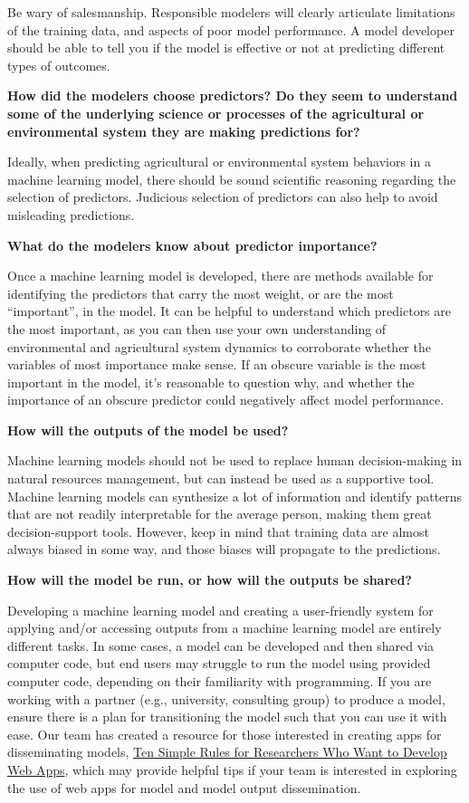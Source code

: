 \documentclass[
]{book}
\begin{document}
Be wary of salesmanship. Responsible modelers will clearly articulate limitations of the training data, and aspects of poor model performance. A model developer should be able to tell you if the model is effective or not at predicting different types of outcomes.

\textbf{How did the modelers choose predictors? Do they seem to understand some of the underlying science or processes of the agricultural or environmental system they are making predictions for?}

Ideally, when predicting agricultural or environmental system behaviors in a machine learning model, there should be sound scientific reasoning regarding the selection of predictors. Judicious selection of predictors can also help to avoid misleading predictions.

\textbf{What do the modelers know about predictor importance?}

Once a machine learning model is developed, there are methods available for identifying the predictors that carry the most weight, or are the most ``important'', in the model. It can be helpful to understand which predictors are the most important, as you can then use your own understanding of environmental and agricultural system dynamics to corroborate whether the variables of most importance make sense. If an obscure variable is the most important in the model, it's reasonable to question why, and whether the importance of an obscure predictor could negatively affect model performance.

\textbf{How will the outputs of the model be used?}

Machine learning models should not be used to replace human decision-making in natural resources management, but can instead be used as a supportive tool. Machine learning models can synthesize a lot of information and identify patterns that are not readily interpretable for the average person, making them great decision-support tools. However, keep in mind that training data are almost always biased in some way, and those biases will propagate to the predictions.

\textbf{How will the model be run, or how will the outputs be shared?}

Developing a machine learning model and creating a user-friendly system for applying and/or accessing outputs from a machine learning model are entirely different tasks. In some cases, a model can be developed and then shared via computer code, but end users may struggle to run the model using provided computer code, depending on their familiarity with programming. If you are working with a partner (e.g., university, consulting group) to produce a model, ensure there is a plan for transitioning the model such that you can use it with ease. Our team has created a resource for those interested in creating apps for disseminating models, \href{https://journals.plos.org/ploscompbiol/article?id=10.1371/journal.pcbi.1009663}{Ten Simple Rules for Researchers Who Want to Develop Web Apps}, which may provide helpful tips if your team is interested in exploring the use of web apps for model and model output dissemination.
\end{document}
